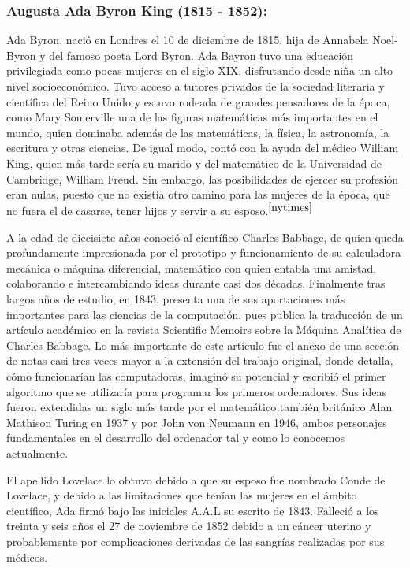 \documentclass[runningheads,a4paper]{llncs}
\begin{document}
\subsubsection{Augusta Ada Byron King (1815 - 1852):} Ada Byron, nació en Londres el 10 de diciembre de 1815, hija de Annabela Noel-Byron y del famoso poeta Lord Byron. Ada Bayron tuvo una educación privilegiada como pocas mujeres en el siglo XIX, disfrutando desde niña un alto nivel socioeconómico. Tuvo acceso a tutores privados de la sociedad literaria y científica del Reino Unido y estuvo rodeada de grandes pensadores de la época, como Mary Somerville una de las figuras matemáticas más importantes en el mundo, quien dominaba además de las matemáticas, la física, la astronomía, la escritura y otras ciencias. De igual modo, contó con la ayuda del médico William King, quien más tarde sería su marido y del matemático de la Universidad de Cambridge, William Freud. Sin embargo, las posibilidades de ejercer su profesión eran nulas, puesto que no existía otro camino para las mujeres de la época, que no fuera el de casarse, tener hijos y servir a su esposo.$^{\cite{nytimes}}$

A la edad de diecisiete años conoció al científico Charles Babbage, de quien queda profundamente impresionada por el prototipo y funcionamiento de su calculadora mecánica o máquina diferencial, matemático con quien entabla una amistad, colaborando e intercambiando ideas durante casi dos décadas. Finalmente tras largos años de estudio, en 1843, presenta una de sus aportaciones más importantes para las ciencias de la computación, pues publica la traducción de un artículo académico en la revista Scientific Memoirs sobre la Máquina Analítica de Charles Babbage. Lo más importante de este artículo fue el anexo de una sección de notas casi tres veces mayor a la extensión del trabajo original, donde detalla, cómo funcionarían las computadoras, imaginó su potencial y escribió el primer algoritmo que se utilizaría para programar los primeros ordenadores. Sus ideas fueron extendidas un siglo más tarde por el matemático también británico Alan Mathison Turing en 1937 y por John von Neumann en 1946, ambos personajes fundamentales en el desarrollo del ordenador tal y como lo conocemos actualmente.

El apellido Lovelace lo obtuvo debido a que su esposo fue nombrado Conde de Lovelace, y debido a las limitaciones que tenían las mujeres en el ámbito científico, Ada firmó bajo las iniciales A.A.L su escrito de 1843. Falleció a los treinta y seis años el 27 de noviembre de 1852 debido a un cáncer uterino y probablemente por complicaciones derivadas de las sangrías realizadas por sus médicos.
\end{document}
